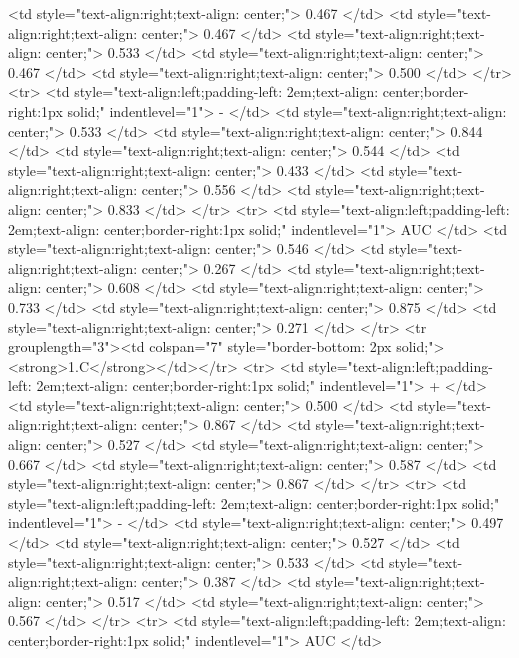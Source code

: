    <td style="text-align:right;text-align: center;"> 0.467 </td>
   <td style="text-align:right;text-align: center;"> 0.467 </td>
   <td style="text-align:right;text-align: center;"> 0.533 </td>
   <td style="text-align:right;text-align: center;"> 0.467 </td>
   <td style="text-align:right;text-align: center;"> 0.500 </td>
  </tr>
  <tr>
   <td style="text-align:left;padding-left: 2em;text-align: center;border-right:1px solid;" indentlevel="1"> - </td>
   <td style="text-align:right;text-align: center;"> 0.533 </td>
   <td style="text-align:right;text-align: center;"> 0.844 </td>
   <td style="text-align:right;text-align: center;"> 0.544 </td>
   <td style="text-align:right;text-align: center;"> 0.433 </td>
   <td style="text-align:right;text-align: center;"> 0.556 </td>
   <td style="text-align:right;text-align: center;"> 0.833 </td>
  </tr>
  <tr>
   <td style="text-align:left;padding-left: 2em;text-align: center;border-right:1px solid;" indentlevel="1"> AUC </td>
   <td style="text-align:right;text-align: center;"> 0.546 </td>
   <td style="text-align:right;text-align: center;"> 0.267 </td>
   <td style="text-align:right;text-align: center;"> 0.608 </td>
   <td style="text-align:right;text-align: center;"> 0.733 </td>
   <td style="text-align:right;text-align: center;"> 0.875 </td>
   <td style="text-align:right;text-align: center;"> 0.271 </td>
  </tr>
  <tr grouplength="3"><td colspan="7" style="border-bottom: 2px solid;"><strong>1.C</strong></td></tr>
<tr>
   <td style="text-align:left;padding-left: 2em;text-align: center;border-right:1px solid;" indentlevel="1"> + </td>
   <td style="text-align:right;text-align: center;"> 0.500 </td>
   <td style="text-align:right;text-align: center;"> 0.867 </td>
   <td style="text-align:right;text-align: center;"> 0.527 </td>
   <td style="text-align:right;text-align: center;"> 0.667 </td>
   <td style="text-align:right;text-align: center;"> 0.587 </td>
   <td style="text-align:right;text-align: center;"> 0.867 </td>
  </tr>
  <tr>
   <td style="text-align:left;padding-left: 2em;text-align: center;border-right:1px solid;" indentlevel="1"> - </td>
   <td style="text-align:right;text-align: center;"> 0.497 </td>
   <td style="text-align:right;text-align: center;"> 0.527 </td>
   <td style="text-align:right;text-align: center;"> 0.533 </td>
   <td style="text-align:right;text-align: center;"> 0.387 </td>
   <td style="text-align:right;text-align: center;"> 0.517 </td>
   <td style="text-align:right;text-align: center;"> 0.567 </td>
  </tr>
  <tr>
   <td style="text-align:left;padding-left: 2em;text-align: center;border-right:1px solid;" indentlevel="1"> AUC </td>
